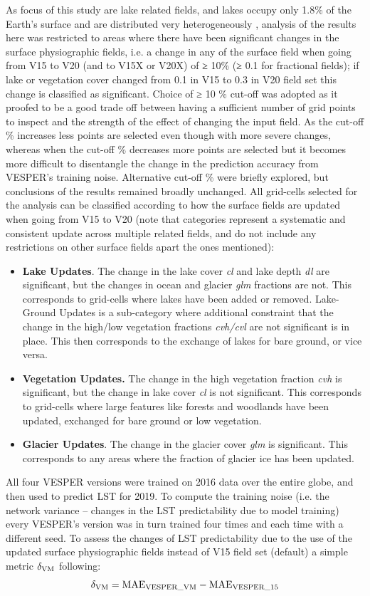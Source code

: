 \documentclass[hess, twostagejnl]{copernicus}
\begin{document}
\noindent As focus of this study are lake related fields, and lakes occupy only 1.8\% of the Earth’s surface and are distributed very heterogeneously \citep{Choulga2014}, analysis of the results here was restricted to areas where there have been significant changes in the surface physiographic fields, i.e. a change in any of the surface field when going from V15 to V20 (and to V15X or V20X) of ≥ 10\% (≥ 0.1 for fractional fields); if lake or vegetation cover changed from 0.1 in V15 to 0.3 in V20 field set this change is classified as significant. Choice of ≥ 10 \% cut-off was adopted as it proofed to be a good trade off between having a sufficient number of grid points to inspect and the strength of the effect of changing the input field. As the cut-off \% increases less points are selected even though with more severe changes, whereas when the cut-off \% decreases more points are selected but it becomes more difficult to disentangle the change in the prediction accuracy from VESPER’s training noise. Alternative cut-off \% were briefly explored, but conclusions of the results remained broadly unchanged. All grid-cells selected for the analysis can be classified according to how the surface fields are updated when going from V15 to V20 (note that categories represent a systematic and consistent update across multiple related fields, and do not include any restrictions on other surface fields apart the ones mentioned): 
\begin{itemize}
	\item \textbf{Lake Updates}. The change in the lake cover \textit{cl} and lake depth \textit{dl} are significant, but the changes in ocean and glacier \textit{glm} fractions are not. This corresponds to grid-cells where lakes have been added or removed. Lake-Ground Updates is a sub-category where additional constraint that the change in the high/low vegetation fractions \textit{cvh/cvl} are not significant is in place. This then corresponds to the exchange of lakes for bare ground, or vice versa.
	\item \textbf{Vegetation Updates.} The change in the high vegetation fraction \textit{cvh} is significant, but the change in lake cover \textit{cl} is not significant. This corresponds to grid-cells where large features like forests and woodlands have been updated, exchanged for bare ground or low vegetation.
	\item \textbf{Glacier Updates}. The change in the glacier cover \textit{glm} is significant. This corresponds to any areas where the fraction of glacier ice has been updated.
\end{itemize}
All four VESPER versions were trained on 2016 data over the entire globe, and then used to predict LST for 2019. To compute the training noise (i.e. the network variance – changes in the LST predictability due to model training) every VESPER’s version was in turn trained four times and each time with a different seed. To assess the changes of LST predictability due to the use of the updated surface physiographic fields instead of V15 field set (default) a simple metric $\delta_{\rm VM}$ following:
\begin{equation} 
	\delta_{\rm VM} = \text{MAE}_{\rm VESPER\_VM} - \text{MAE}_{\rm VESPER\_15} 
\end{equation}
\end{document}
